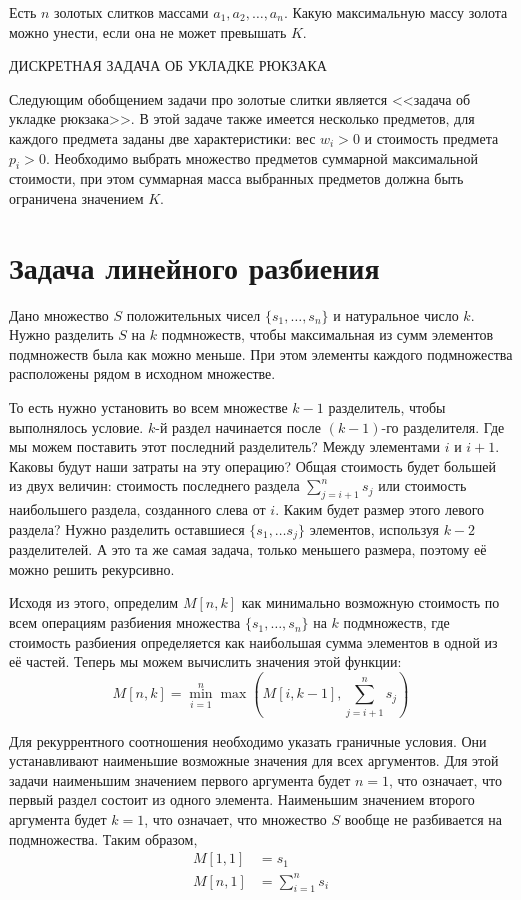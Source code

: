 \documentclass[14pt,openany]{book}
\begin{document}
Есть $n$ золотых слитков массами $a_1, a_2, \ldots, a_n$. Какую максимальную массу золота можно унести, если она не может превышать $K$.

ДИСКРЕТНАЯ ЗАДАЧА ОБ УКЛАДКЕ РЮКЗАКА

Следующим обобщением задачи про золотые слитки является <<задача об укладке рюкзака>>. В этой задаче также имеется несколько предметов, для каждого предмета заданы две характеристики: вес $w_i > 0$ и стоимость предмета $p_i > 0$. Необходимо выбрать множество предметов суммарной максимальной стоимости, при этом суммарная масса выбранных предметов должна быть ограничена значением $K$.

\section{Задача линейного разбиения}

Дано множество $S$ положительных чисел $\{s_1, \ldots , s_n\}$ и натуральное число $k$.
Нужно разделить $S$ на $k$ подмножеств, чтобы максимальная из сумм элементов подмножеств была 
как можно меньше. При этом элементы каждого подмножества расположены рядом в исходном множестве.

То есть нужно установить во всем множестве $k-1$ разделитель, чтобы выполнялось условие.
$k$-й раздел начинается после $(k-1)$-го разделителя. Где мы можем поставить этот последний
разделитель? Между элементами $i$ и $i+1$. Каковы будут наши затраты на эту операцию?
Общая стоимость будет большей из двух величин: стоимость последнего раздела $\sum_{j=i+1}^{n}s_j$
или стоимость наибольшего раздела, созданного слева от $i$. Каким будет размер этого левого раздела?
Нужно разделить оставшиеся $\{s_1,\ldots s_j\}$ элементов, используя $k-2$ разделителей.
А это та же самая задача, только меньшего размера, поэтому её можно решить рекурсивно.

Исходя из этого, определим $M[n, k]$ как минимально возможную стоимость по всем операциям
разбиения множества $\{s_1, \ldots , s_n\}$ на $k$ подмножеств, где стоимость разбиения
определяется как наибольшая сумма элементов в одной из её частей. Теперь мы можем вычислить
значения этой функции:
$$ M[n,k] = \min_{i=1}^{n}\max\left(M[i,k-1], \sum_{j=i+1}^{n}s_j\right)$$

Для рекуррентного соотношения необходимо указать граничные условия. Они устанавливают
наименьшие возможные значения для всех аргументов. Для этой задачи наименьшим значением
первого аргумента будет $n=1$, что означает, что первый раздел состоит из одного элемента.
Наименьшим значением второго аргумента будет $k=1$, что означает, что множество $S$
вообще не разбивается на подмножества. Таким образом,
\begin{align*}
M[1,1] &= s_1 \\
M[n,1] &= \sum_{i=1}^{n}s_i
\end{align*}
\end{document}
